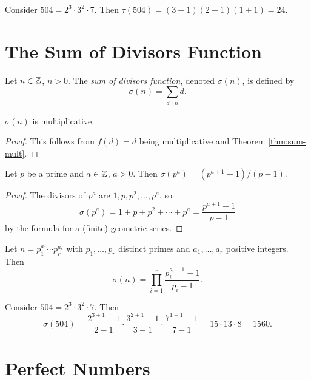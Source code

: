 \begin{example}
  Consider $504 = 2^3 \cdot 3^2 \cdot 7$.
  Then
  $\tau(504) = (3 + 1)(2 + 1)(1 + 1) = 24$.
\end{example}

\section{The Sum of Divisors Function}

\begin{definition}
  Let $n \in \mathbb{Z}$, $n > 0$. The
  \emph{sum of divisors function},
  denoted $\sigma(n)$, is defined by
  \[
    \sigma(n) = \sum_{d \mid n} d.
  \]
\end{definition}

\begin{theorem}
  $\sigma(n)$ is multiplicative.
\end{theorem}

\begin{proof}
  This follows from
  $f(d) = d$ being multiplicative
  and Theorem \ref{thm:sum-mult}.
\end{proof}

\begin{theorem}
  Let $p$ be a prime and $a \in \mathbb{Z}$,
  $a > 0$. Then
  $\sigma(p^a) = (p^{a + 1} - 1) / (p - 1)$.
\end{theorem}

\begin{proof}
  The divisors of $p^a$ are
  $1, p, p^2, \dots, p^a$, so
  \[
    \sigma(p^a)
    = 1 + p + p^2 + \cdots + p^a
    = \frac{p^{a + 1} - 1}{p - 1}
  \]
  by the formula for a (finite)
  geometric series.
\end{proof}

\begin{theorem}
  Let $n = p_1^{a_1} \cdots p_r^{a_r}$
  with $p_1, \dots, p_r$ distinct
  primes and $a_1, \dots, a_r$ positive
  integers. Then
  \[
    \sigma(n) = \prod_{i = 1}^r
    \frac{p_i^{a_i + 1} - 1}{p_i - 1}.
  \]
\end{theorem}

\begin{example}
  Consider $504 = 2^3 \cdot 3^2 \cdot 7$.
  Then
  \[
    \sigma(504)
    = \frac{2^{3 + 1} - 1}{2 - 1}
    \cdot \frac{3^{2 + 1} - 1}{3 - 1}
    \cdot \frac{7^{1 + 1} - 1}{7 - 1}
    = 15 \cdot 13 \cdot 8 = 1560.
  \]
\end{example}

\section{Perfect Numbers}

